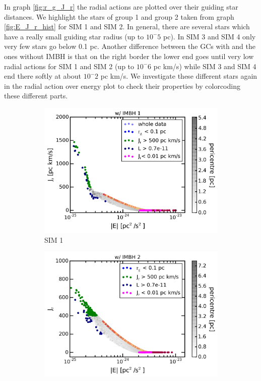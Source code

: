 In graph \ref{fig:r_g_J_r} the radial actions are plotted over their guiding star distances. We highlight the stars of group 1 and group 2 taken from graph \ref{fig:E_J_r_hist} for SIM 1 and SIM 2. In general, there are several stars which have a really small guiding star radius (up to \(10^-5\) pc). In SIM 3 and SIM 4 only very few stars go below 0.1 pc. Another difference between the \acp{GC} with and the ones without \ac{IMBH} is that on the right border the lower end goes until very low radial actions for SIM 1 and SIM 2 (up to \(10^-6\) pc km/s) while SIM 3 and SIM 4 end there softly at about \(10^-2\) pc km/s. We investigate these different stars again in the radial action over energy plot to check their properties by colorcoding these different parts.

\begin{figure}
\centering
	\begin{subfigure}{0.475\textwidth}
	\centering
		\includegraphics[width=\textwidth]{Plots/E_J_r_parts_IMBH1.png}
		\caption{SIM 1}
		\label{fig:E_J_r_parts_IMBH1}
	\end{subfigure}
	\hfill
	\begin{subfigure}{0.475\textwidth}
	\centering
		\includegraphics[width=\textwidth]{Plots/E_J_r_parts_IMBH2.png}

\end{subfigure}
\end{figure}
